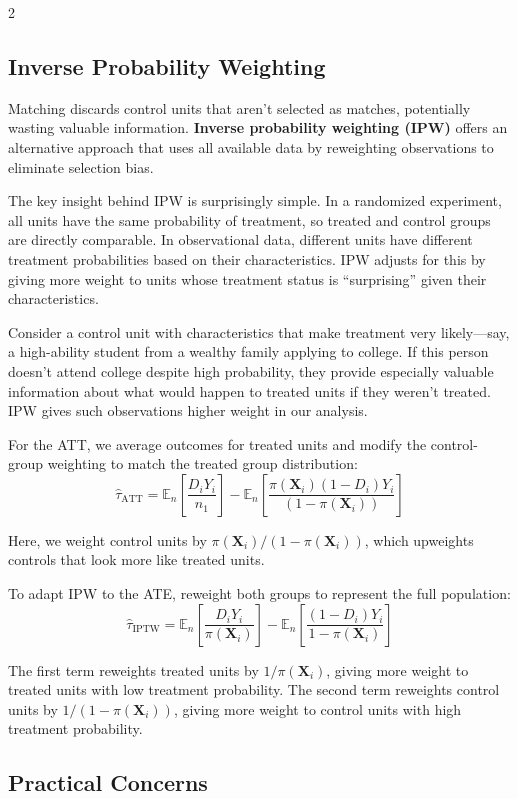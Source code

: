 \documentclass[12pt]{article}
\begin{document}
\begin{multicols}{2}
\subsection*{Inverse Probability Weighting}

Matching discards control units that aren't selected as matches, potentially wasting valuable information.
\textbf{Inverse probability weighting (IPW)} offers an alternative approach that uses all available data by reweighting observations to eliminate selection bias.

The key insight behind IPW is surprisingly simple.
In a randomized experiment, all units have the same probability of treatment, so treated and control groups are directly comparable.
In observational data, different units have different treatment probabilities based on their characteristics.
IPW adjusts for this by giving more weight to units whose treatment status is ``surprising'' given their characteristics.

Consider a control unit with characteristics that make treatment very likely---say, a high-ability student from a wealthy family applying to college.
If this person doesn't attend college despite high probability, they provide especially valuable information about what would happen to treated units if they weren't treated.
IPW gives such observations higher weight in our analysis.

For the ATT, we average outcomes for treated units and modify the control-group weighting to match the treated group distribution:
$$\hat{\tau}_{\text{ATT}} = \mathbb{E}_n\left[\frac{D_i Y_i}{n_1}\right] - \mathbb{E}_n\left[\frac{\pi(\bm{X}_i)(1-D_i)Y_i}{(1-\pi(\bm{X}_i))}\right]$$

Here, we weight control units by $\pi(\bm{X}_i)/(1-\pi(\bm{X}_i))$, which upweights controls that look more like treated units.

To adapt IPW to the ATE, reweight both groups to represent the full population:
$$\hat{\tau}_{\text{IPTW}} = \mathbb{E}_n\left[\frac{D_i Y_i}{\pi(\bm{X}_i)}\right] - \mathbb{E}_n\left[\frac{(1-D_i)Y_i}{1-\pi(\bm{X}_i)}\right]$$

The first term reweights treated units by $1/\pi(\bm{X}_i)$, giving more weight to treated units with low treatment probability.
The second term reweights control units by $1/(1-\pi(\bm{X}_i))$, giving more weight to control units with high treatment probability.

\subsection*{Practical Concerns}


\end{multicols}
\end{document}
